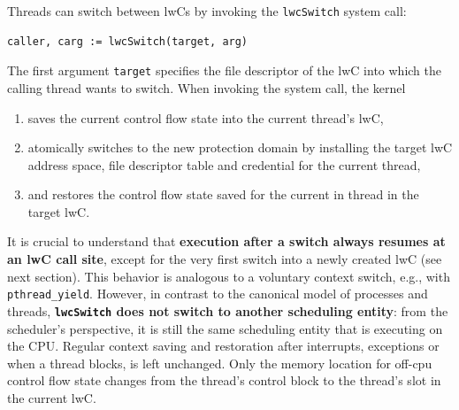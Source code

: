 \documentclass[10pt,twocolumn,a4paper]{article}
\begin{document}
Threads can switch between lwCs by invoking the \lstinline{lwcSwitch} system call:

\begin{lstlisting}[style=syscallinline]
  caller, carg := lwcSwitch(target, arg) 
\end{lstlisting}

The first argument \lstinline{target} specifies the file descriptor of the lwC into which the calling thread wants to switch.
When invoking the system call, the kernel
\begin{enumerate}[nosep,label=(\alph*)]
\item saves the current control flow state into the current thread's lwC,
\item atomically switches to the new protection domain by installing the target lwC address space, file descriptor table and credential for the current thread,
\item and restores the control flow state saved for the current in thread in the target lwC.
\end{enumerate}
\cite{lwckernelrepo,lwcpaper}


It is crucial to understand that \textbf{execution after a switch always resumes at an lwC call site}, except for the very first switch into a newly created lwC (see next section).
This behavior is analogous to a voluntary context switch, e.g., with \lstinline{pthread_yield}.
However, in contrast to the canonical model of processes and threads, \textbf{\lstinline{lwcSwitch} does not switch to another scheduling entity}:
from the scheduler's perspective, it is still the same scheduling entity that is executing on the CPU.
Regular context saving and restoration after interrupts, exceptions or when a thread blocks, is left unchanged.
Only the memory location for off-cpu control flow state changes from the thread's control block to the thread's slot in the current lwC.
\cite{lwckernelrepo}
\end{document}
